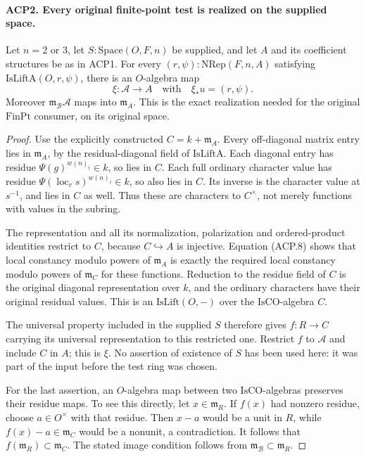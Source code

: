 \paragraph{ACP2. Every original finite-point test is realized on the supplied space.}
\label{claim:ACP2}
Let \(n=2\) or \(3\), let \(S:\mathrm{Space}(O,F,n)\) be
supplied, and let \(A\) and its coefficient structures be as in
ACP1.  For every \((r,\psi):\mathrm{NRep}(F,n,A)\) satisfying
\(\mathrm{IsLiftA}(O,r,\psi)\), there is an \(O\)-algebra map
\[
 \xi:\mathcal A\longrightarrow A
 \quad\text{with}\quad \xi_*u=(r,\psi).
                                                        \tag{ACP.10}
\]
Moreover \(\mathfrak m_{\mathcal B}\mathcal A\) maps into
\(\mathfrak m_A\).  This is the exact realization needed for
the original \(\mathrm{FinPt}\) consumer, on its original space.

\begin{proof}
Use the explicitly constructed \(C=k+\mathfrak m_A\).
Every off-diagonal matrix entry lies in \(\mathfrak m_A\),
by the residual-diagonal field of \(\mathrm{IsLiftA}\).
Each diagonal entry has residue
\(\Psi(g)^{w(n)_i}\in k\), so lies in \(C\).
Each full ordinary character value has residue
\(\Psi(\operatorname{loc}_v s)^{w(n)_i}\in k\), so also lies
in \(C\).  Its inverse is the character value at \(s^{-1}\),
and lies in \(C\) as well.  Thus these are characters to
\(C^\times\), not merely functions with values in the subring.

The representation and all its normalization, polarization and
ordered-product identities restrict to \(C\), because
\(C\hookrightarrow A\) is injective.  Equation (ACP.8) shows
that local constancy modulo powers of \(\mathfrak m_A\)
is exactly the required local constancy modulo powers of
\(\mathfrak m_C\) for these functions.  Reduction to the
residue field of \(C\) is the original diagonal representation
over \(k\), and the ordinary characters have their original
residual values.  This is an \(\mathrm{IsLift}(O,-)\) over
the \(\mathrm{IsCO}\)-algebra \(C\).

The universal property included in the supplied \(S\) therefore
gives \(f:R\to C\) carrying its universal representation to
this restricted one.  Restrict \(f\) to \(\mathcal A\) and
include \(C\) in \(A\); this is \(\xi\).
No assertion of existence of \(S\) has been used here: it was
part of the input before the test ring was chosen.

For the last assertion, an \(O\)-algebra map between two
\(\mathrm{IsCO}\)-algebras preserves their residue maps.
To see this directly, let \(x\in\mathfrak m_R\).  If \(f(x)\)
had nonzero residue, choose \(a\in O^\times\) with that residue.
Then \(x-a\) would be a unit in \(R\), while
\(f(x)-a\in\mathfrak m_C\) would be a nonunit, a contradiction.
It follows that \(f(\mathfrak m_R)\subset\mathfrak m_C\).
The stated image condition follows from
\(\mathfrak m_{\mathcal B}\subset\mathfrak m_R\).
\end{proof}

